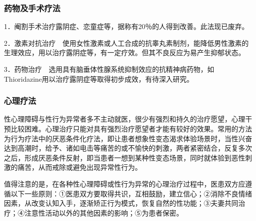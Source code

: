 \subsubsection{药物及手术疗法}

1．阉割手术治疗露阴症、恋童症等，据称有20％的人得到改善。此法现已废弃。

2．激素对抗治疗　使用女性激素或人工合成的抗睾丸素制剂，能降低男性激素的生理效应，用以治疗露阴症等，有一定疗效。但其不良反应为易产生抑郁状态。

3．药物治疗　选用具有脑垂体性腺系统抑制效应的抗精神病药物，如Thioridazine用以治疗露阴症等取得初步成效，有待深入研究。

\subsubsection{心理疗法}

性心理障碍与性行为异常者多不主动就医，很少有强烈和持久的治疗愿望，心理干预比较困难。心理治疗只能对具有强烈治疗愿望者才能有较好的效果。常用的方法为行为疗法中的厌恶条件化疗法，即让患者想象性变态渴求体验场景时，当性兴奋达到高潮时，给予、诸如电击等痛苦的或不愉快的刺激，两者紧密结合，反复多次之后，形成厌恶条件反射，即当患者一想到某种性变态场景，同时就体验到恶性刺激的痛苦，从而戒除或避免出现异常性行为。

值得注意的是，在各种性心理障碍或性行为异常的心理治疗过程中，医患双方应遵循以下一些原则：①医患双方要取得共识，互相鼓励，建立信心；②消除不良情绪因素，从改变认知入手，逐渐矫正行为模式，恢复自然的性功能；③夫妻共同治疗；④注意性活动以外的其他因素的影响；⑤为患者保密。
